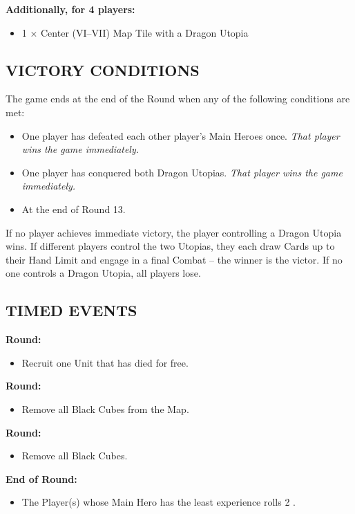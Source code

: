 \begin{multicols*}{2}
\textbf{Additionally, for 4 players:}
\begin{itemize}
  \item 1 × Center (VI–VII) Map Tile with a Dragon Utopia
\end{itemize}

\subsection*{\MakeUppercase{Victory Conditions}}
The game ends at the end of the Round when any of the following conditions are met:

\begin{itemize}
 \item One player has defeated each other player's Main Heroes once. \textit{That player wins the game immediately.}
 \item One player has conquered both Dragon Utopias. \textit{That player wins the game immediately.}
 \item At the end of Round 13.
\end{itemize}

If no player achieves immediate victory, the player controlling a Dragon Utopia wins.
If different players control the two Utopias, they each draw Cards up to their Hand Limit and engage in a final Combat -- the winner is the victor.
If no one controls a Dragon Utopia, all players lose.
\subsection*{\MakeUppercase{Timed Events}}

\textbf{ Round:}
\begin{itemize}
  \item Recruit one Unit that has died for free.
\end{itemize}
\textbf{ Round:}
\begin{itemize}
  \item Remove all Black Cubes from the Map.
\end{itemize}
\textbf{ Round:}
\begin{itemize}
  \item Remove all Black Cubes.
\end{itemize}
\textbf{End of  Round:}
\begin{itemize}
  \item The Player(s) whose Main Hero has the least experience rolls 2 .
\end{itemize}


\end{multicols*}
